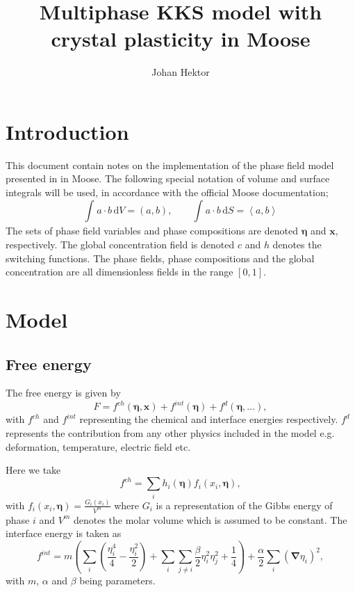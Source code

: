 \documentclass[12pt,a4paper]{article}
\providecommand{\vbf}[1]{\boldsymbol{#1}}
\providecommand{\gradient}[0]{\vbf{\nabla}}
\providecommand{\inte}[4]{\int_{#1}^{#2}{#3}\,\mathrm{d}{#4}}
\providecommand{\vint}[2]{\left(#1,#2\right)}
\providecommand{\sint}[2]{\left<#1,#2\right>}
\begin{document}
\title{Multiphase KKS model with crystal plasticity in Moose}
\author{Johan Hektor}
\maketitle

\section{Introduction}
This document contain notes on the implementation of the phase field model presented in \cite{hektor2016coupled} in Moose.
The following special notation of volume and surface integrals will be used, in accordance with the official Moose documentation;
\begin{equation}
  \inte{}{}{a\cdot b}{V}=\vint{a}{b}, \qquad \inte{}{}{a\cdot b}{S}=\sint{a}{b}
\end{equation}
The sets of phase field variables and phase compositions are denoted $\vbf{\eta}$ and $\vbf{x}$, respectively. 
The global concentration field is denoted $c$ and $h$ denotes the switching functions.
The phase fields, phase compositions and the global concentration are all dimensionless fields in the range $[0,1]$.

\section{Model}

\subsection{Free energy}
The free energy is given by
\begin{equation}
  F = f^{ch}(\vbf{\eta},\vbf{x})+f^{int}(\vbf{\eta})+f^d(\vbf{\eta},\dots) ,
  \label{eq:F}
\end{equation}
with $f^{ch}$ and $f^{int}$ representing the chemical and interface energies respectively. 
$f^d$ represents the contribution from any other physics included in the model e.g. deformation, temperature, electric field etc.

Here we take
\begin{equation}
  f^{ch}=\sum_ih_i(\vbf{\eta})f_i(x_i,\vbf{\eta}),
  \label{eq:fch}
\end{equation}
with $f_i(x_i,\vbf{\eta})=\frac{G_i(x_i)}{V^m}$ where $G_i$ is a representation of the Gibbs energy of phase $i$ and $V^m$ denotes the molar volume which is assumed to be constant.
The interface energy is taken as
\begin{equation}
  f^{int}=m\left(\sum_i\left(\frac{\eta_i^4}{4}-\frac{\eta_i^2}{2}\right)+\sum_i\sum_{j\ne i}\frac{\beta}{2}\eta_i^2\eta_j^2+\frac{1}{4}\right)+\frac{\alpha}{2}\sum_i\left(\gradient\eta_i\right)^2,
  \label{eq:fint}
\end{equation}
with $m$, $\alpha$ and $\beta$ being parameters.
\end{document}
